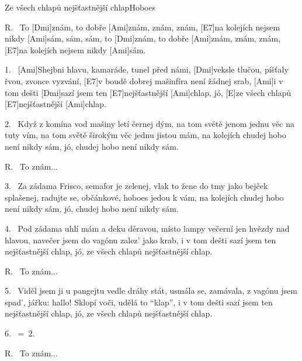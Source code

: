 \begin{song}{Ze všech chlapů nejšťastnější chlap}{Hoboes}

\begin{xverse}{R.~}
To [Dmi]znám, to dobře [Ami]znám, znám, znám,
[E7]na kolejích nejsem nikdy [Ami]sám, sám, sám,
to [Dmi]znám, to dobře [Ami]znám, znám, znám,
[E7]na kolejích nejsem nikdy [Ami]sám.
\end{xverse}

\begin{xverse}{1.~}
[Ami]Shejbni hlavu, kamaráde, tunel před námi,
[Dmi]veksle tlučou, píšťaly řvou, zvonce vyzvání,
[E7]v boudě dobrej mašinfíra není žádnej srab,
[Ami]i v tom dešti [Dmi]sazí jsem ten [E7]nejšťastnější [Ami]chlap,
jó, [E]ze všech chlapů [E7]nejšťastnější [Ami]chlap.
\end{xverse}

\begin{xverse}{2.~}
Když z komína vod mašiny letí černej dým,
na tom světě jenom jednu věc na tuty vím,
na tom světě širokým věc jednu jistou mám,
na kolejích chudej hobo není nikdy sám,
jó, chudej hobo není nikdy sám.
\end{xverse}

\begin{xverse}{R.~}
To znám...
\end{xverse}


\begin{xverse}{3.~}
Za zádama Frisco, semafor je zelenej,
vlak to žene do tmy jako bejček splašenej,
radujte se, občánkové, hoboes jedou k vám,
na kolejích chudej hobo není nikdy sám,
jó, chudej hobo není nikdy sám.
\end{xverse}

\begin{xverse}{4.~}
Pod zádama uhlí mám a deku děravou,
místo lampy večerní jen hvězdy nad hlavou,
navečer jsem do vagónu zalez' jako krab,
i v tom dešti sazí jsem ten nejšťastnější chlap,
jó, ze všech chlapů nejšťastnější chlap.
\end{xverse}

\begin{xverse}{R.~}
To znám...
\end{xverse}

\begin{xverse}{5.~}
Viděl jsem ji u pangejtu vedle dráhy stát,
usmála se, zamávala, z vagónu jsem spad',
jářku: hallo! Sklopí voči, udělá to ``klap'',
i v tom dešti sazí jsem ten nejšťastnější chlap,
jó, ze všech chlapů nejšťastnější chlap.
\end{xverse}

\begin{xverse}{6.~}
=\ 2.
\end{xverse}

\begin{xverse}{R.~}
To znám...
\end{xverse}

\end{song}
